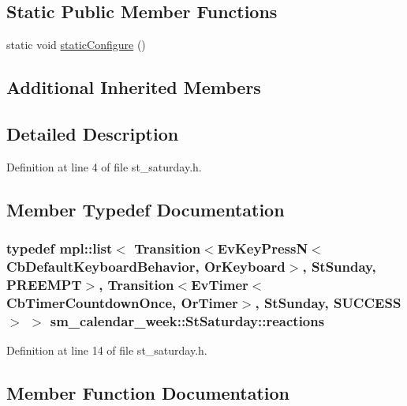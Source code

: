 \subsection*{Static Public Member Functions}
\begin{DoxyCompactItemize}
\item 
static void \hyperlink{structsm__calendar__week_1_1StSaturday_a3cf24c07476dab0e76c90e5d5164bd5a}{static\+Configure} ()
\end{DoxyCompactItemize}
\subsection*{Additional Inherited Members}


\subsection{Detailed Description}


Definition at line 4 of file st\+\_\+saturday.\+h.



\subsection{Member Typedef Documentation}
\subsubsection[{\texorpdfstring{reactions}{reactions}}]{\setlength{\rightskip}{0pt plus 5cm}typedef mpl\+::list$<$ Transition$<$Ev\+Key\+PressN$<$Cb\+Default\+Keyboard\+Behavior, {\bf Or\+Keyboard}$>$, {\bf St\+Sunday}, {\bf P\+R\+E\+E\+M\+PT}$>$, Transition$<$Ev\+Timer$<$Cb\+Timer\+Countdown\+Once, {\bf Or\+Timer}$>$, {\bf St\+Sunday}, {\bf S\+U\+C\+C\+E\+SS}$>$ $>$ {\bf sm\+\_\+calendar\+\_\+week\+::\+St\+Saturday\+::reactions}}\hypertarget{structsm__calendar__week_1_1StSaturday_a8c581c22cf6a32adec475c5caadd4b16}{}\label{structsm__calendar__week_1_1StSaturday_a8c581c22cf6a32adec475c5caadd4b16}


Definition at line 14 of file st\+\_\+saturday.\+h.



\subsection{Member Function Documentation}
